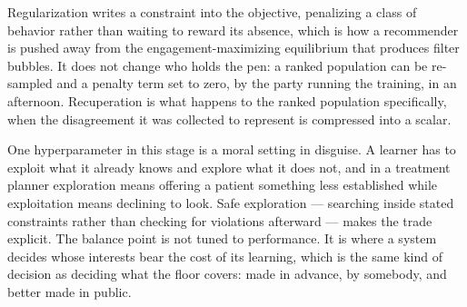 Regularization writes a constraint into the objective, penalizing a class of behavior rather than waiting to reward its absence, which is how a recommender is pushed away from the engagement-maximizing equilibrium that produces filter bubbles. It does not change who holds the pen: a ranked population can be re-sampled and a penalty term set to zero, by the party running the training, in an afternoon. Recuperation is what happens to the ranked population specifically, when the disagreement it was collected to represent is compressed into a scalar.

One hyperparameter in this stage is a moral setting in disguise. A learner has to exploit what it already knows and explore what it does not, and in a treatment planner exploration means offering a patient something less established while exploitation means declining to look. Safe exploration — searching inside stated constraints rather than checking for violations afterward — makes the trade explicit. The balance point is not tuned to performance. It is where a system decides whose interests bear the cost of its learning, which is the same kind of decision as deciding what the floor covers: made in advance, by somebody, and better made in public.
